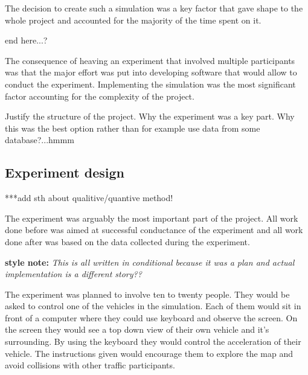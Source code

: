 \documentclass[11pt,english]{article}
\begin{document}
The decision to create such a simulation was a key factor that gave shape to the whole project and accounted for the majority of the time spent on it. 


end here...?


The consequence of heaving an experiment that involved multiple participants was that the major effort was put into developing software that would allow to conduct the experiment. Implementing the simulation was the most significant factor accounting for the complexity of the project. 


Justify the structure of the project. Why the experiment was a key part. Why this was
the best option rather than for example use data from some database?...hmmm

\subsection{Experiment design}

***add sth about qualitive/quantive method!


The experiment was arguably the most important part of the project. All work done before was aimed at successful conductance of the experiment and all work done after was based on the data collected during the experiment. 


\textbf{style note:} \textit{This is all written in conditional because it was a plan and actual implementation is a different story??}

The experiment was planned to involve ten to twenty people. They would be asked to control one of the vehicles in the simulation. Each of them would sit in front of a computer where they could use keyboard and observe the screen.  On the screen they would see a top down view of their own vehicle and it's surrounding. By using the keyboard they would control the acceleration of their vehicle.
The instructions given would encourage them to explore the map and avoid collisions with other traffic participants.
\end{document}
